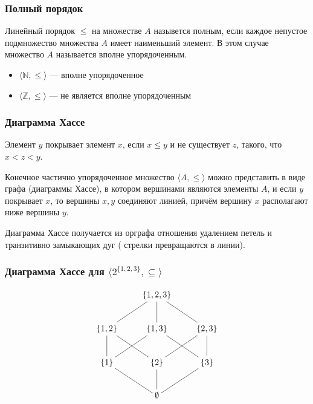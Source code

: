 \begin{frame}
    \frametitle{Полный порядок}
    
    \begin{definition}
        Линейный порядок $\leq$ на множестве $A$ назывется \alert{полным}, если каждое непустое подмножество множества $A$ имеет наименьший элемент. В этом случае множество $A$ называется \alert{вполне упорядоченным}.
    \end{definition}
    
    \begin{itemize}
        \item $\langle\mathbb{N},\leq\rangle$ --- вполне упорядоченное
        \item $\langle\mathbb{Z},\leq\rangle$ --- не является вполне упорядоченным
    \end{itemize}
\end{frame}

\begin{frame}
    \frametitle{Диаграмма Хассе}
    
    \begin{definition}
        Элемент $y$ \alert{покрывает} элемент $x$, если $x\leq y$ и не существует $z$, такого, что $x<z<y$. 
    \end{definition}
    
    \begin{definition}
        Конечное частично упорядоченное множество $\langle A,\leq\rangle$ можно представить в виде графа (\alert{диаграммы Хассе}), в котором вершинами являются элементы $A$, и если $y$ покрывает $x$, то вершины $x,y$ соединяют линией, причём вершину $x$ располагают ниже вершины $y$.
    \end{definition}
\end{frame}

Диаграмма Хассе получается из орграфа отношения удалением петель и транзитивно замыкающих дуг ( стрелки превращаются в линии).

\begin{frame}
    \frametitle{Диаграмма Хассе для $\langle2^{\{1,2,3\}},\subseteq\rangle$}
    
    \[
        {\xymatrix{
            *{} 
                &\{1,2,3\}
                    &*{}
                        \\
            \{1,2\} \ar@{-}[ur]
                &\{1,3\} \ar@{-}[u]
                    &\{2,3\} \ar@{-}[ul]
                        \\
            \{1\} \ar@{-}[u] \ar@{-}[ur]
                &\{2\} \ar@{-}[ul] \ar@{-}[ur]
                    &\{3\} \ar@{-}[u] \ar@{-}[ul]
                        \\
            *{}
                &\emptyset \ar@{-}[ul] \ar@{-}[u] \ar@{-}[ur]
                    &*{}
        }}
    \]
\end{frame}    


